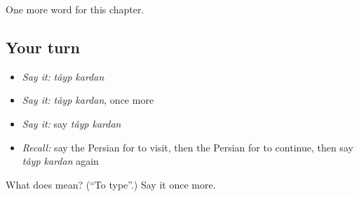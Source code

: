 \begin{grammarlens}[title={What you've built}]
One more word for this chapter.
\end{grammarlens}

\subsection*{Your turn}
\begin{itemize}
\raggedright
  \item \emph{Say it:} \emph{tâyp kardan}
  \item \emph{Say it:} \emph{tâyp kardan}, once more
  \item \emph{Say it:} say \emph{tâyp kardan}
  \item \emph{Recall:} say the Persian for to visit, then the Persian for to continue, then say \emph{tâyp kardan} again
\end{itemize}

\begin{tcolorbox}[breakable,colback=teal!4,colframe=teal!35!black,title={Before you move on}]
What does   mean? (\textquotedblleft{}To type\textquotedblright{}.) Say it once more.
\end{tcolorbox}
